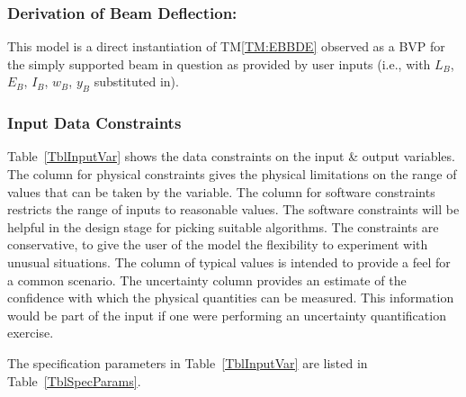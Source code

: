 \documentclass[12pt]{article}
\newcommand{\tref}[1]{TM\ref{#1}}
\begin{document}
\subsubsection*{Derivation of Beam Deflection:}

This model is a direct instantiation of \tref{TM:EBBDE} observed as a BVP for
the simply supported beam in question as provided by user inputs (i.e., with
$L_B$, $E_B$, $I_B$, $w_B$, $y_B$ substituted in).

\subsubsection{Input Data Constraints}
\label{sec_DataConstraints}

Table~\ref{TblInputVar} shows the data constraints on the input \& output
variables.  The column for physical constraints gives the physical limitations
on the range of values that can be taken by the variable.  The column for
software constraints restricts the range of inputs to reasonable values.  The
software constraints will be helpful in the design stage for picking suitable
algorithms.  The constraints are conservative, to give the user of the model the
flexibility to experiment with unusual situations.  The column of typical values
is intended to provide a feel for a common scenario.  The uncertainty column
provides an estimate of the confidence with which the physical quantities can be
measured.  This information would be part of the input if one were performing an
uncertainty quantification exercise.

The specification parameters in Table~\ref{TblInputVar} are listed in
Table~\ref{TblSpecParams}.
\end{document}
